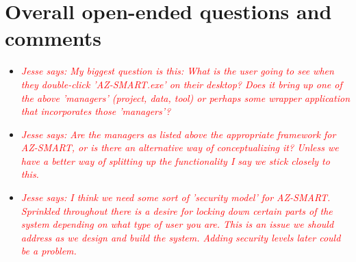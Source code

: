 \documentclass[titlepage]{article}
\begin{document}
\section{Overall open-ended questions and comments}

\begin{itemize}
	\item \textcolor{red}{\textit{Jesse says: My biggest question is this: What is the user going to see when they double-click 'AZ-SMART.exe' on their desktop?  Does it bring up one of the above 'managers' (project, data, tool) or perhaps some wrapper application that incorporates those 'managers'?}}
	\item \textcolor{red}{\textit{Jesse says: Are the managers as listed above the appropriate framework for AZ-SMART, or is there an alternative way of conceptualizing it?  Unless we have a better way of splitting up the functionality I say we stick closely to this.}}
	\item \textcolor{red}{\textit{Jesse says: I think we need some sort of 'security model' for AZ-SMART.  Sprinkled throughout there is a desire for locking down certain parts of the system depending on what type of user you are.  This is an issue we should address as we design and build the system. Adding security levels later could be a problem.}}
\end{itemize}
\end{document}
